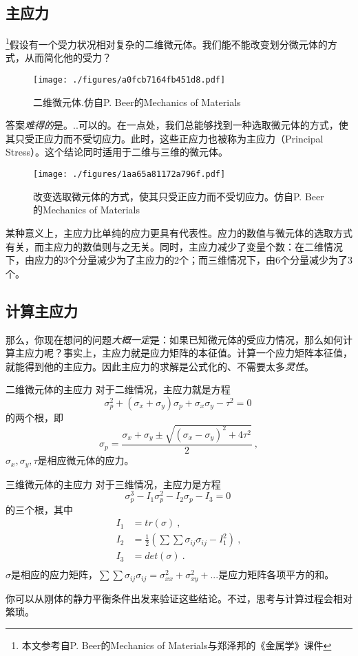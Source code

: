 

\subsection{主应力}
\footnote{本文参考自P. Beer的Mechanics of Materials与郑泽邦的《金属学》课件}假设有一个受力状况相对复杂的二维微元体。我们能不能改变划分微元体的方式，从而简化他的受力？
\begin{figure}[ht]
\centering
\texttt{[image: ./figures/a0fcb7164fb451d8.pdf]}
\caption{二维微元体.仿自P. Beer的Mechanics of Materials} \label{fig_PRSTR_1}
\end{figure}

答案\textsl{难得的}是。..可以的。在一点处，我们总能够找到一种选取微元体的方式，使其只受正应力而不受切应力。此时，这些正应力也被称为主应力（Principal Stress）。这个结论同时适用于二维与三维的微元体。
\begin{figure}[ht]
\centering
\texttt{[image: ./figures/1aa65a81172a796f.pdf]}
\caption{改变选取微元体的方式，使其只受正应力而不受切应力。仿自P. Beer的Mechanics of Materials} \label{fig_PRSTR_2}
\end{figure}

某种意义上，主应力比单纯的应力更具有代表性。应力的数值与微元体的选取方式有关，而主应力的数值则与之无关。同时，主应力减少了变量个数：在二维情况下，由应力的3个分量减少为了主应力的2个；而三维情况下，由6个分量减少为了3个。

\subsection{计算主应力}

那么，你现在想问的问题\textsl{大概一定}是：如果已知微元体的受应力情况，那么如何计算主应力呢？事实上，主应力就是应力矩阵的本征值。计算一个应力矩阵本征值，就能得到他的主应力。因此主应力的求解是公式化的、不需要太多\textsl{灵性}。

\begin{example}{二维微元体的主应力}
对于二维情况，主应力就是方程
$$\sigma_p^2+(\sigma_x+\sigma_y)\sigma_p+\sigma_x\sigma_y-\tau^2=0~$$
的两个根，即
$$\sigma_p=\frac{\sigma_x+\sigma_y \pm \sqrt{(\sigma_x-\sigma_y)^2+4\tau^2}}{2}~,$$
$\sigma_x,\sigma_y,\tau$是相应微元体的应力。
\end{example}

\begin{example}{三维微元体的主应力}
对于三维情况，主应力是方程 
$$
\sigma_p^3-I_1\sigma_p^2-I_2\sigma_p-I_3=0~
$$
的三个根，其中
$$
\begin{aligned}
I_1&=tr(\sigma)~,\\
I_2&=\frac{1}{2} ({\sum \sum \sigma_{ij} \sigma_{ij} -I_1^2})~,\\
I_3&=det(\sigma)~.\\
\end{aligned}
$$
$\sigma$是相应的应力矩阵，$\sum \sum \sigma_{ij} \sigma_{ij}=\sigma_{xx}^2+\sigma_{xy}^2+...$是应力矩阵各项平方的和。
\end{example}
你可以从刚体的静力平衡条件出发来验证这些结论。不过，思考与计算过程会相对繁琐。
